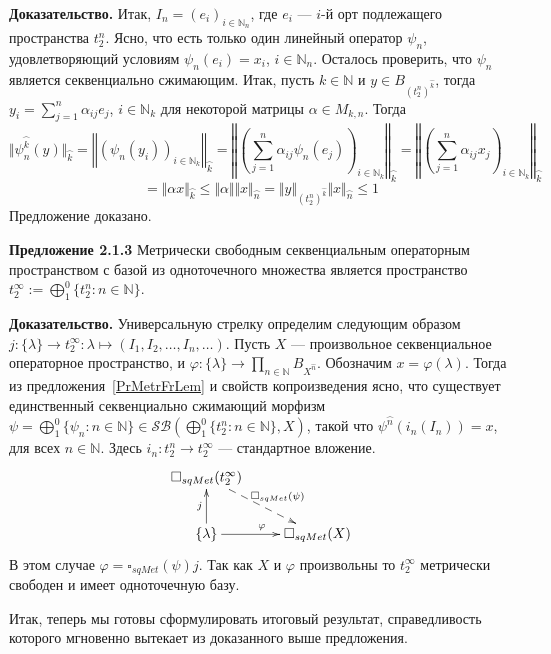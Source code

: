 \documentclass[12pt]{article}
\begin{document}
{\bf Доказательство.} Итак, $I_n = {(e_i)}_{i\in\mathbb{N}_n}$, где $e_i$ --- $i$-й
орт подлежащего пространства $t_2^n$. Ясно, что есть только один линейный
оператор $\psi_n$, удовлетворяющий условиям $\psi_n(e_i) = x_i$,
$i\in\mathbb{N}_n$. Осталось проверить, что $\psi_n$ является секвенциально
сжимающим. Итак, пусть $k \in \mathbb{N}$ и $y \in B_{{(t_2^n)}^{\wideparen{k}}}
$, тогда $y_i = \sum\limits_{j = 1}^n \alpha_{ij}e_j$, $i\in\mathbb{N}_k$ для
некоторой матрицы $\alpha\in M_{k,n}$. Тогда 
$$
\Vert\psi_n^{\wideparen{k}}(y)\Vert_{\wideparen{k}}
=\left\Vert{\left(
    \psi_n(y_i)
\right)}_{i\in\mathbb{N}_k}\right\Vert_{\wideparen{k}}
=\left\Vert{\left(
    \sum\limits_{j=1}^n\alpha_{ij}\psi_n(e_j)
\right)}_{i\in\mathbb{N}_k}\right\Vert_{\wideparen{k}}
=\left\Vert{\left(
    \sum\limits_{j=1}^n\alpha_{ij}x_j
\right)}_{i\in\mathbb{N}_k}\right\Vert_{\wideparen{k}}
$$
$$
=\Vert\alpha x\Vert_{\wideparen{k}}
\leq\Vert\alpha\Vert\Vert x\Vert_{\wideparen{n}}
=\Vert y\Vert_{{(t_2^n)}^{\wideparen{k}}}\Vert x\Vert_{\wideparen{n}}\leq 1
$$
Предложение доказано.

\medskip

{\bf Предложение 2.1.3} Метрически свободным секвенциальным операторным
пространством с базой из одноточечного множества является пространство
$t_2^{\infty} := \bigoplus_1^0  \{t_2^n: n \in \mathbb{N} \}$.

{\bf Доказательство.} Универсальную стрелку определим следующим образом
$j: \{\lambda \}\to t_2^\infty:\lambda\mapsto(I_1,I_2,\ldots,I_n,\ldots)$. Пусть
$X$ --- произвольное секвенциальное операторное пространство, и
$\varphi: \{\lambda \}\to \prod_{n \in \mathbb{N}} B_{X^{\wideparen{n}}}$.
Обозначим $x=\varphi(\lambda)$. Тогда из предложения~\ref{PrMetrFrLem} и свойств
копроизведения ясно, что существует единственный секвенциально сжимающий морфизм
$\psi=\bigoplus_1^0 \{\psi_n:n\in\mathbb{N} \}\in\mathcal{SB}\left(\bigoplus_1^0 \{
t_2^n:n\in\mathbb{N} \}, X\right)$, такой что $\psi^{\wideparen{n}}(i_n(I_n)) =
x$, для всех $n \in \mathbb{N}$. Здесь $i_n:t_2^n\to t_2^\infty$ --- стандартное
вложение.
$$
\xymatrix{
{\square_{sqMet} (t_2^\infty)} 
\ar@{-->}[dr]^{\square_{sqMet} (\psi)} & \\  %
{ \{\lambda \}} 
\ar[u]^{j} \ar[r]^{\varphi} &{\square_{sqMet} (X)}}  %
$$
В этом случае $\varphi=\square_{sqMet}(\psi) j$. Так как $X$ и $\varphi$
произвольны то $t_2^\infty$ метрически свободен и имеет одноточечную базу. 

\medskip

Итак, теперь мы готовы сформулировать итоговый результат, справедливость
которого мгновенно вытекает из доказанного выше предложения.
\end{document}
